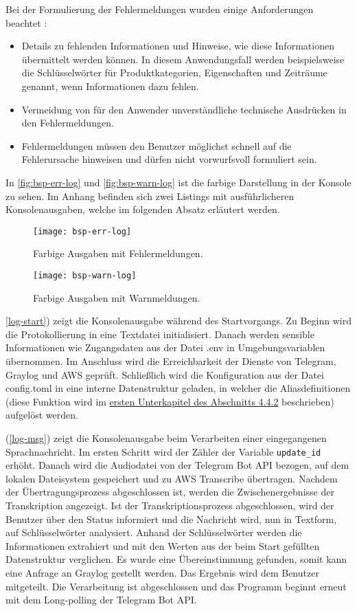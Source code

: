Bei der Formulierung der Fehlermeldungen wurden einige Anforderungen beachtet \cite[S. 495]{ux}: 

\begin{itemize}
\item Details zu fehlenden Informationen und Hinweise, wie diese Informationen übermittelt werden können. In diesem Anwendungsfall werden beispielsweise die Schlüsselwörter für Produktkategorien, Eigenschaften und Zeiträume genannt, wenn Informationen dazu fehlen.
\item Vermeidung von für den Anwender unverständliche technische Ausdrücken in den Fehlermeldungen.
\item Fehlermeldungen müssen den Benutzer möglichst schnell auf die Fehlerursache hinweisen und dürfen nicht vorwurfsvoll formuliert sein.
\end{itemize}

In \autoref{fig:bsp-err-log} und \autoref{fig:bsp-warn-log} ist die farbige Darstellung in der Konsole zu sehen. Im Anhang befinden sich zwei Listings mit ausführlicheren Konsolenausgaben, welche im folgenden Absatz erläutert werden.

\begin{figure}[h!]
\centering
\texttt{[image: bsp-err-log]}
\caption{Farbige Ausgaben mit Fehlermeldungen.}
\label{fig:bsp-err-log}
\end{figure}

\begin{figure}[h!]
\centering
\texttt{[image: bsp-warn-log]}
\caption{Farbige Ausgaben mit Warnmeldungen.}
\label{fig:bsp-warn-log}
\end{figure}

\autoref{log-start}) zeigt die Konsolenausgabe während des Startvorgangs. Zu Beginn wird die Protokollierung in eine Textdatei initialisiert. Danach werden sensible Informationen wie Zugangsdaten aus der Datei .env in Umgebungsvariablen übernommen. Im Anschluss wird die Erreichbarkeit der Dienste von Telegram, Graylog und AWS geprüft. Schließlich wird die Konfiguration aus der Datei config.toml in eine interne Datenstruktur geladen, in welcher die Aliasdefinitionen (diese Funktion wird im \hyperref[sec:aliasdef]{ersten Unterkapitel des Abschnitts 4.4.2} beschrieben) aufgelöst werden. 

(\autoref{log-msg}) zeigt die Konsolenausgabe beim Verarbeiten einer eingegangenen Sprachnachricht. Im ersten Schritt wird der Zähler der Variable \lstinline{update_id} erhöht. Danach wird die Audiodatei von der Telegram Bot API bezogen, auf dem lokalen Dateisystem gespeichert und zu AWS Transcribe übertragen. Nachdem der Übertragungsprozess abgeschlossen ist, werden die Zwischenergebnisse der Transkription angezeigt. Ist der Transkriptionsprozess abgeschlossen, wird der Benutzer über den Status informiert und die Nachricht wird, nun in Textform, auf Schlüsselwörter analysiert. Anhand der Schlüsselwörter werden die Informationen extrahiert und mit den Werten aus der beim Start gefüllten Datenstruktur verglichen. Es wurde eine Übereinstimmung gefunden, somit kann eine Anfrage an Graylog gestellt werden. Das Ergebnis wird dem Benutzer mitgeteilt. Die Verarbeitung ist abgeschlossen und das Programm beginnt erneut mit dem Long-polling der Telegram Bot API.

